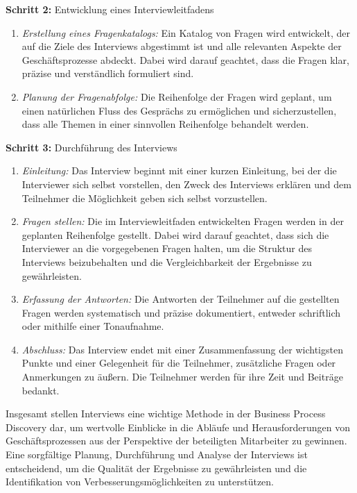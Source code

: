 \textbf{Schritt 2:} Entwicklung eines Interviewleitfadens
\begin{enumerate}
\item \textit{Erstellung eines Fragenkatalogs:} Ein Katalog von Fragen wird entwickelt, der auf die Ziele des Interviews abgestimmt ist und alle relevanten Aspekte der Geschäftsprozesse abdeckt. Dabei wird darauf geachtet, dass die Fragen klar, präzise und verständlich formuliert sind.
\item \textit{Planung der Fragenabfolge:} Die Reihenfolge der Fragen wird geplant, um einen natürlichen Fluss des Gesprächs zu ermöglichen und sicherzustellen, dass alle Themen in einer sinnvollen Reihenfolge behandelt werden.
\end{enumerate}

\textbf{Schritt 3:} Durchführung des Interviews
\begin{enumerate}
\item \textit{Einleitung:} Das Interview beginnt mit einer kurzen Einleitung, bei der die Interviewer sich selbst vorstellen, den Zweck des Interviews erklären und dem Teilnehmer die Möglichkeit geben sich selbst vorzustellen.
\item \textit{Fragen stellen:} Die im Interviewleitfaden entwickelten Fragen werden in der geplanten Reihenfolge gestellt. Dabei wird darauf geachtet, dass sich die Interviewer an die vorgegebenen Fragen halten, um die Struktur des Interviews beizubehalten und die Vergleichbarkeit der Ergebnisse zu gewährleisten.
\item \textit{Erfassung der Antworten:} Die Antworten der Teilnehmer auf die gestellten Fragen werden systematisch und präzise dokumentiert, entweder schriftlich oder mithilfe einer Tonaufnahme.
\item \textit{Abschluss:} Das Interview endet mit einer Zusammenfassung der wichtigsten Punkte und einer Gelegenheit für die Teilnehmer, zusätzliche Fragen oder Anmerkungen zu äußern. Die Teilnehmer werden für ihre Zeit und Beiträge bedankt.
\end{enumerate}

Insgesamt stellen Interviews eine wichtige Methode in der Business Process Discovery dar, um wertvolle Einblicke in die Abläufe und Herausforderungen von Geschäftsprozessen aus der Perspektive der beteiligten Mitarbeiter zu gewinnen. Eine sorgfältige Planung, Durchführung und Analyse der Interviews ist entscheidend, um die Qualität der Ergebnisse zu gewährleisten und die Identifikation von Verbesserungsmöglichkeiten zu unterstützen.